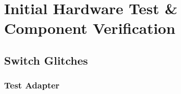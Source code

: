 \chapter{Initial Hardware Test \& Component Verification}\label{cha:eval}

\section{Switch Glitches}\label{sec:switchGlitch}
\subsection{Test Adapter}\label{sec:testAdapter}